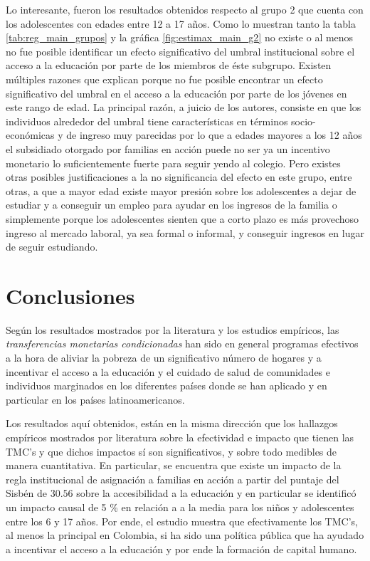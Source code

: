 \documentclass[AER]{AEA}
\begin{document}
Lo interesante, fueron los resultados obtenidos respecto al grupo 2 que cuenta con los adolescentes con edades entre 12 a 17 años. Como lo muestran tanto la tabla \ref{tab:reg_main_grupos} y la gráfica \ref{fig:estimax_main_g2} no existe o al menos no fue posible identificar un efecto significativo del umbral institucional sobre el acceso a la educación por parte de los miembros de éste subgrupo. Existen múltiples razones que explican porque no fue posible encontrar un efecto significativo del umbral en el acceso a la educación por parte de los jóvenes en este rango de edad. La principal razón, a juicio de los autores, consiste en que los individuos alrededor del umbral tiene características en términos socio-económicas y de ingreso muy parecidas por lo que a edades mayores a los 12 años el subsidiado otorgado por familias en acción puede no ser ya un incentivo monetario lo suficientemente fuerte para seguir yendo al colegio. Pero existes otras posibles justificaciones a la no significancia del efecto en este grupo, entre otras, a que a mayor edad existe mayor presión sobre los adolescentes a dejar de estudiar y a conseguir un empleo para ayudar en los ingresos de la familia o simplemente porque los adolescentes sienten que a corto plazo es más provechoso ingreso al mercado laboral, ya sea formal o informal, y conseguir ingresos en lugar de seguir estudiando. 

\section{Conclusiones}

Según los resultados mostrados por la literatura y los estudios empíricos, las \textit{transferencias monetarias condicionadas} han sido en general programas efectivos a la hora de aliviar la pobreza de un significativo número de hogares y a incentivar el acceso a la educación y el cuidado de salud de comunidades e individuos marginados en los diferentes países donde se han aplicado y en particular en los países latinoamericanos. 

Los resultados aquí obtenidos, están en la misma dirección que los hallazgos empíricos mostrados por literatura sobre la efectividad e impacto que tienen las TMC's y que dichos impactos sí son significativos, y sobre todo medibles de manera cuantitativa. En particular, se encuentra que existe un impacto de la regla institucional de asignación a familias en acción a partir del puntaje del Sisbén de $30.56$ sobre la accesibilidad a la educación y en particular se identificó un impacto causal de 5 \% en relación a a la media para los niños y adolescentes entre los 6 y 17 años. Por ende, el estudio muestra que efectivamente los TMC's, al menos la principal en Colombia, si ha sido una política pública que ha ayudado a incentivar el acceso a la educación y por ende la formación de capital humano. 
\end{document}
